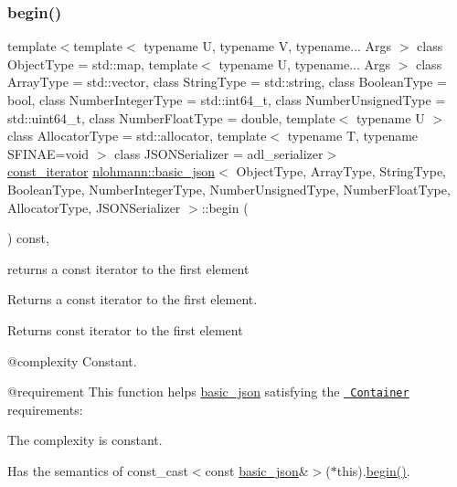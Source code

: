 \subsubsection{\texorpdfstring{begin()}{begin()}\hspace{0.1cm}{\footnotesize\ttfamily [2/2]}}
{\footnotesize\ttfamily template$<$template$<$ typename U, typename V, typename... Args $>$ class Object\+Type = std\+::map, template$<$ typename U, typename... Args $>$ class Array\+Type = std\+::vector, class String\+Type  = std\+::string, class Boolean\+Type  = bool, class Number\+Integer\+Type  = std\+::int64\+\_\+t, class Number\+Unsigned\+Type  = std\+::uint64\+\_\+t, class Number\+Float\+Type  = double, template$<$ typename U $>$ class Allocator\+Type = std\+::allocator, template$<$ typename T, typename S\+F\+I\+N\+A\+E=void $>$ class J\+S\+O\+N\+Serializer = adl\+\_\+serializer$>$ \\
\mbox{\hyperlink{classnlohmann_1_1basic__json_a41a70cf9993951836d129bb1c2b3126a}{const\+\_\+iterator}} \mbox{\hyperlink{classnlohmann_1_1basic__json}{nlohmann\+::basic\+\_\+json}}$<$ Object\+Type, Array\+Type, String\+Type, Boolean\+Type, Number\+Integer\+Type, Number\+Unsigned\+Type, Number\+Float\+Type, Allocator\+Type, J\+S\+O\+N\+Serializer $>$\+::begin (\begin{DoxyParamCaption}{ }\end{DoxyParamCaption}) const\hspace{0.3cm}{\ttfamily [inline]}, {\ttfamily [noexcept]}}



returns a const iterator to the first element 

Returns a const iterator to the first element.

 \begin{DoxyReturn}{Returns}
const iterator to the first element
\end{DoxyReturn}
@complexity Constant.

@requirement This function helps {\ttfamily \mbox{\hyperlink{classnlohmann_1_1basic__json}{basic\+\_\+json}}} satisfying the \href{http://en.cppreference.com/w/cpp/concept/Container}{\texttt{ Container}} requirements\+:
\begin{DoxyItemize}
\item The complexity is constant.
\item Has the semantics of {\ttfamily const\+\_\+cast$<$const \mbox{\hyperlink{classnlohmann_1_1basic__json}{basic\+\_\+json}}\&$>$($\ast$this).\mbox{\hyperlink{classnlohmann_1_1basic__json_a0ff28dac23f2bdecee9564d07f51dcdc}{begin()}}}.
\end{DoxyItemize}

